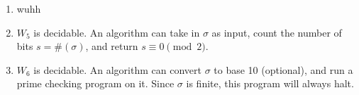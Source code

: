 \documentclass[12pt]{article}
\newcommand{\code}{\lstinline}
\begin{document}
\begin{enumerate}
\begin{proof}
        For the sake of contradiction, assume there is a program \code{B} that solves this problem. We will construct an algorithm \code{A} that solves the halting problem, which works as follows:
        \begin{itemize}
            \item \code{A} takes in two inputs, a program \code{P} and an input \code{I}
        \end{itemize}
    \end{proof}
    \item wuhh
    \item $W_5$ is decidable. An algorithm can take in $\sigma$ as input, count the number of bits $s=\#(\sigma)$, and return $s\equiv 0\pmod{2}$.
    \item $W_6$ is decidable. An algorithm can convert $\sigma$ to base 10 (optional), and run a prime checking program on it. Since $\sigma$ is finite, this program will always halt.
\end{enumerate}
\end{document}

